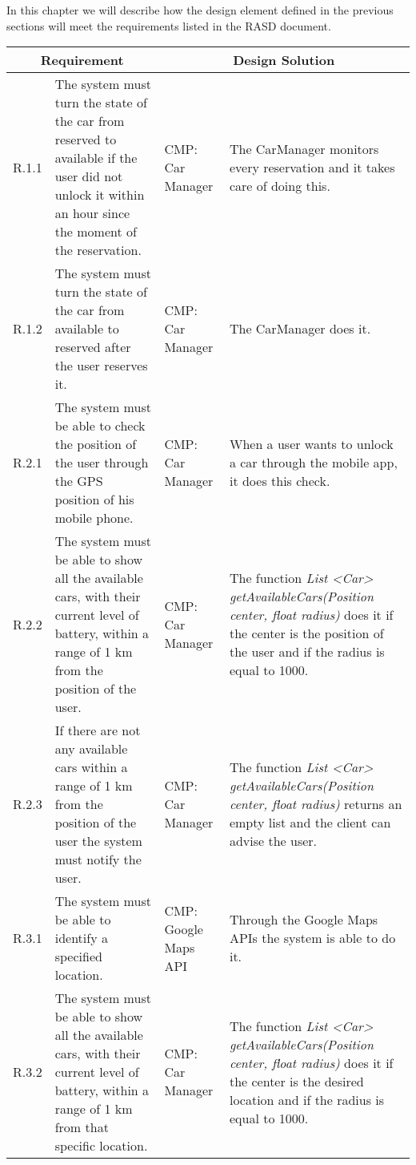 In this chapter we will describe how the design element defined in the previous sections will meet the requirements listed in the RASD document.

\begin{center}
\begin{longtable}{|p{}|p{}|>{\raggedright\arraybackslash}p{}|>{\raggedright\arraybackslash}p{}|}
\hline
\multicolumn{2}{|c|}{\textbf{Requirement}} & \multicolumn{2}{c|}{\textbf{Design Solution}} \\ \hline
R.1.1 & The system must turn the state of the car from reserved to available if the user did not unlock it within an hour since the moment of the reservation. & CMP: \linebreak Car Manager & The CarManager monitors every reservation and it takes care of doing this.  \\ \hline
R.1.2 & The system must turn the state of the car from available to reserved after the user reserves it. & CMP: Car Manager & The CarManager does it. \\ \hline
R.2.1 & The system must be able to check the position of the user through the GPS position of his mobile phone. & CMP: Car Manager & When a user wants to unlock a car through the mobile app, it does this check. \\ \hline
R.2.2 & The system must be able to show all the available cars, with their current level of battery, within a range of 1 km from the position of the user. & CMP: Car Manager & The function \textit{List \textless Car\textgreater{} getAvailableCars(Position center, float radius)} does it if the center is the position of the user and if the radius is equal to 1000. \\ \hline
R.2.3 & If there are not any available cars within a range of 1 km from the position of the user the system must notify the user. & CMP: Car Manager & The function \textit{List \textless Car\textgreater{} getAvailableCars(Position center, float radius)} returns an empty list and the client can advise the user. \\ \hline
R.3.1 & The system must be able to identify a specified location. & CMP: Google Maps API & Through the Google Maps APIs the system is able to do it. \\ \hline
R.3.2 & The system must be able to show all the available cars, with their current level of battery, within a range of 1 km from that specific location. & CMP: Car Manager & The function \textit{List \textless Car\textgreater{} getAvailableCars(Position center, float radius)} does it if the center is the desired location and if the radius is equal to 1000. \\ \hline

\end{longtable}
\end{center}
